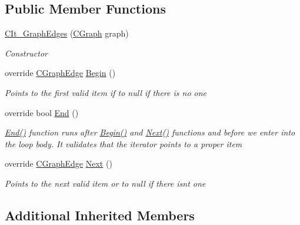 \subsection*{Public Member Functions}
\begin{DoxyCompactItemize}
\item 
\hyperlink{class_graph_library_1_1_c_it___graph_edges_a10e2198178770159c4652a81eb6a4d1a}{C\+It\+\_\+\+Graph\+Edges} (\hyperlink{class_graph_library_1_1_c_graph}{C\+Graph} graph)
\begin{DoxyCompactList}\small\item\em Constructor \end{DoxyCompactList}\item 
override \hyperlink{class_graph_library_1_1_c_graph_edge}{C\+Graph\+Edge} \hyperlink{class_graph_library_1_1_c_it___graph_edges_a5934153f52d3b0e5bc7de7dbcb3d454d}{Begin} ()
\begin{DoxyCompactList}\small\item\em Points to the first valid item if to null if there is no one \end{DoxyCompactList}\item 
override bool \hyperlink{class_graph_library_1_1_c_it___graph_edges_a64d0c02c22a40db7b62bf7cbf0de02fc}{End} ()
\begin{DoxyCompactList}\small\item\em \hyperlink{class_graph_library_1_1_c_it___graph_edges_a64d0c02c22a40db7b62bf7cbf0de02fc}{End()} function runs after \hyperlink{class_graph_library_1_1_c_it___graph_edges_a5934153f52d3b0e5bc7de7dbcb3d454d}{Begin()} and \hyperlink{class_graph_library_1_1_c_it___graph_edges_ab14c4a444a51dac76ed83211798f05a8}{Next()} functions and before we enter into the loop body. It validates that the iterator points to a proper item \end{DoxyCompactList}\item 
override \hyperlink{class_graph_library_1_1_c_graph_edge}{C\+Graph\+Edge} \hyperlink{class_graph_library_1_1_c_it___graph_edges_ab14c4a444a51dac76ed83211798f05a8}{Next} ()
\begin{DoxyCompactList}\small\item\em Points to the next valid item or to null if there isn\textquotesingle{}t one \end{DoxyCompactList}\end{DoxyCompactItemize}
\subsection*{Additional Inherited Members}


